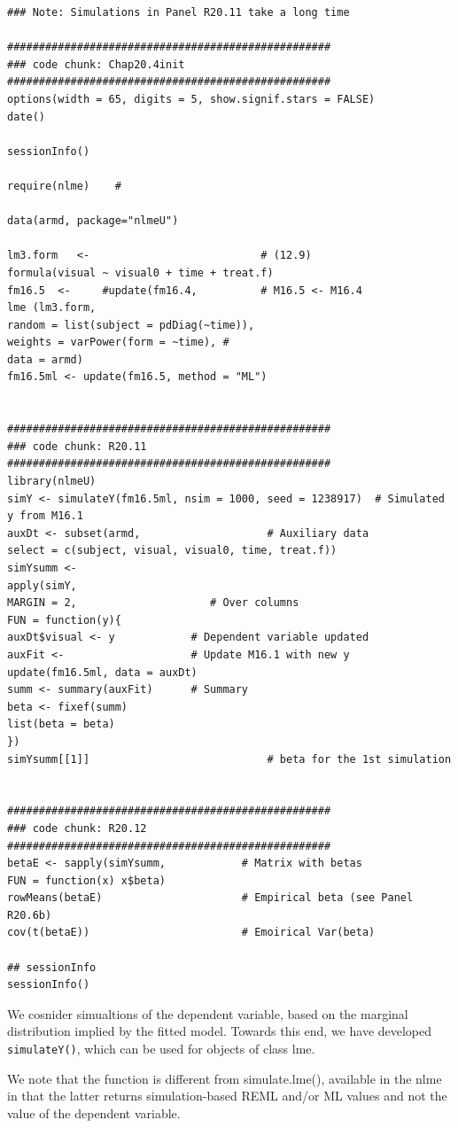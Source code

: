 \documentclass[a4paper,12pt]{article}
\begin{document}
\begin{verbatim}
### Note: Simulations in Panel R20.11 take a long time

###################################################
### code chunk: Chap20.4init
###################################################
options(width = 65, digits = 5, show.signif.stars = FALSE)
date()

sessionInfo()

require(nlme)    #

data(armd, package="nlmeU")

lm3.form   <-                           # (12.9)
formula(visual ~ visual0 + time + treat.f) 
fm16.5  <-     #update(fm16.4,          # M16.5 <- M16.4           
lme (lm3.form, 
random = list(subject = pdDiag(~time)),
weights = varPower(form = ~time), # 
data = armd)            
fm16.5ml <- update(fm16.5, method = "ML")


###################################################
### code chunk: R20.11
###################################################
library(nlmeU)
simY <- simulateY(fm16.5ml, nsim = 1000, seed = 1238917)  # Simulated y from M16.1
auxDt <- subset(armd,                    # Auxiliary data
select = c(subject, visual, visual0, time, treat.f))
simYsumm <- 
apply(simY, 
MARGIN = 2,                     # Over columns
FUN = function(y){    
auxDt$visual <- y            # Dependent variable updated
auxFit <-                    # Update M16.1 with new y
update(fm16.5ml, data = auxDt)
summ <- summary(auxFit)      # Summary
beta <- fixef(summ)     
list(beta = beta)
})
simYsumm[[1]]                            # beta for the 1st simulation


###################################################
### code chunk: R20.12
###################################################
betaE <- sapply(simYsumm,            # Matrix with betas
FUN = function(x) x$beta)
rowMeans(betaE)                      # Empirical beta (see Panel R20.6b)
cov(t(betaE))                        # Emoirical Var(beta)

## sessionInfo
sessionInfo()
\end{verbatim}
We cosnider simualtions of the dependent variable, based on the marginal distribution 
implied by the fitted model.
Towards this end, we have developed \texttt{simulateY()}, which can be used for objects of class lme.

We note that the function is different from simulate.lme(), available in the nlme in that the latter returns
simulation-based REML and/or ML values and not the value of the dependent variable.
\end{document}
